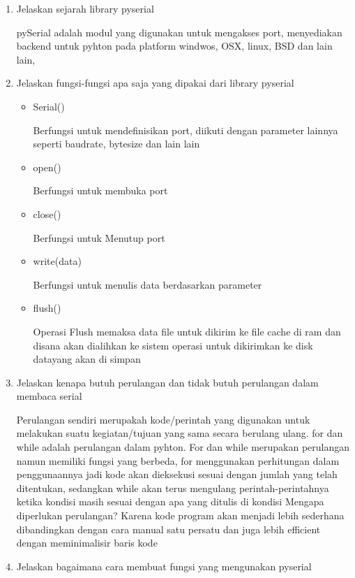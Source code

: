 \begin{enumerate}
\item Jelaskan sejarah library pyserial

pySerial adalah modul yang digunakan untuk mengakses port, menyediakan backend untuk pyhton pada platform windwos, OSX, linux, BSD dan lain lain,  

\item Jelaskan fungsi-fungsi apa saja yang dipakai dari library pyserial

	\begin{itemize}
	\item Serial()
	
	Berfungsi untuk mendefinisikan port, diikuti dengan parameter lainnya seperti baudrate, bytesize dan lain lain
	
	\item open()
	
	Berfungsi untuk membuka port
	
	\item close()
	
	Berfungsi untuk Menutup port
	
	\item write(data)
	
	Berfungsi untuk menulis data berdasarkan parameter
	
	\item flush()
	
	Operasi Flush memaksa data file untuk dikirim ke file cache di ram dan disana akan dialihkan ke sistem operasi untuk dikirimkan ke disk datayang akan di simpan
	\end{itemize}

\item Jelaskan kenapa butuh perulangan dan tidak butuh perulangan dalam membaca serial

Perulangan sendiri merupakah kode/perintah yang digunakan untuk melakukan suatu kegiatan/tujuan yang sama secara berulang ulang.  for dan while adalah perulangan dalam pyhton.
For dan while merupakan perulangan namun memiliki fungsi yang berbeda, for menggunakan perhitungan dalam penggunaannya jadi kode akan dieksekusi sesuai dengan jumlah yang telah ditentukan, sedangkan while akan terus mengulang perintah-perintahnya ketika kondisi masih sesuai dengan apa yang ditulis di kondisi
Mengapa diperlukan perulangan? Karena kode program akan menjadi lebih sederhana dibandingkan dengan cara manual satu persatu dan juga lebih efficient dengan meminimalisir baris kode

\item Jelaskan bagaimana cara membuat fungsi yang mengunakan pyserial


\end{enumerate}
